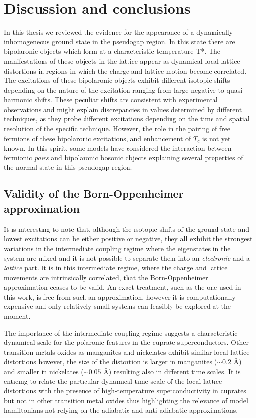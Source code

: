 \chapter{Discussion and conclusions}
\label{chap:conclusions}

In this thesis we reviewed the evidence for the appearance of a dynamically inhomogeneous ground state in the pseudogap region. 
In this state there are bipolaronic objects which form at a characteristic temperature T*. 
The manifestations of these objects in the lattice appear as dynamical local lattice distortions in regions in which the charge and lattice motion become correlated. 
The excitations of these bipolaronic objects exhibit different isotopic shifts depending on the nature of the excitation ranging from large negative to quasi-harmonic shifts. 
These peculiar shifts are consistent with experimental observations and might explain discrepancies in values determined by different techniques, as they probe different excitations depending on the time and spatial resolution of the specific technique. 
However, the role in the pairing of free fermions of these bipolaronic excitations, and enhancement of $T_c$ is not yet known. 
In this spirit, some models have considered the interaction between fermionic \textit{pairs} and bipolaronic bosonic objects \cite{Bussmann-Holder2005,Mihailovic2001,Bar-Yam1991,doi:10.1142/S0217979200003812} explaining several properties of the normal state in this pseudogap region. 

\section{Validity of the Born-Oppenheimer approximation}

It is interesting to note that, although the isotopic shifts of the ground state and lowest excitations can be either positive or negative, they all exhibit the strongest variations in the intermediate coupling regime where the eigenstates in the system are mixed and it is not possible to separate them into an \textit{electronic} and a \textit{lattice} part.
It is in this intermediate regime, where the charge and lattice movements are intrinsically correlated, that the Born-Oppenheimer approximation ceases to be valid.
An exact treatment, such as the one used in this work, is free from such an approximation, however it is computationally expensive and  only relatively small systems can feasibly be explored at the moment.

The importance of the intermediate coupling regime suggests a characteristic dynamical scale for the polaronic features in the cuprate superconductors. 
Other transition metals oxides as manganites and nickelates exhibit similar local lattice distortions however, the size of the distortion is larger in manganites ($\sim 0.2$ \AA) \cite{Tyson1996} and smaller in nickelates ($\sim 0.05$ \AA) \cite{Acosta-Alejandro2008} resulting also in different time scales. 
It is enticing to relate the particular dynamical time scale of the local lattice distortions with the presence of high-temperature superconductivity in cuprates but not in other transition metal oxides thus highlighting the relevance of model hamiltonians not relying on the adiabatic and anti-adiabatic approximations.

